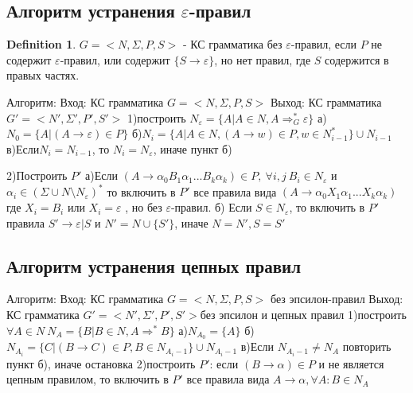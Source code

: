 \documentclass[a4paper]{article}
\theoremstyle{plain}
\theoremstyle{remark}
\theoremstyle{definition}
\newtheorem*{definition-star}{Definition}
\begin{document}
\subsection{Алгоритм устранения $\varepsilon$-правил}
\begin{definition-star}$G=<N,\Sigma,P,S>$ - КС грамматика без $\varepsilon$-правил, если $P$ не содержит $\varepsilon$-правил, или содержит $\{S\rightarrow \varepsilon\}$, но нет правил, где $S$ содержится в правых частях.
\end{definition-star}
Алгоритм:
Вход: КС грамматика $G=<N,\Sigma,P,S>$
Выход: КС грамматика $G'=<N',\Sigma',P',S'>$
1)построить $N_\varepsilon = \{A|A\in N,A \Rightarrow_G^* \varepsilon\}$
а)$N_0=\{A|(A\rightarrow \varepsilon) \in P\}$
б)$N_i = \{A|A\in N,(A \rightarrow w)\in P, w \in N_{i-1}^*\} \cup N_{i-1}$
в)Если$N_i = N_{i-1}$, то $N_i=N_\varepsilon$, иначе пункт б)

2)Построить $P'$
а)Если $(A\rightarrow \alpha_0B_1\alpha_1...B_k\alpha_k)\in P,\  \forall i,j \ B_i \in N_\varepsilon$ и $\alpha_i \in (\Sigma \cup N\setminus N_\varepsilon)^*$
то включить в $P'$ все правила вида $(A\rightarrow \alpha_0X_1\alpha_1...X_k\alpha_k)$где $X_i=B_i$ или $X_i=\varepsilon$ , но без $\varepsilon$-правил.
б) Если $S\in N_\varepsilon$, то включить в $P'$ правила  $S'\rightarrow\varepsilon|S$ и $N'=N\cup\{S'\}$, иначе $N=N',S=S'$
\subsection{Алгоритм устранения цепных правил}
Алгоритм:
Вход: КС грамматика $G=<N,\Sigma,P,S>$ без эпсилон-правил
Выход: КС грамматика $G'=<N',\Sigma',P',S'>$без эпсилон и цепных правил
1)построить $ \forall A \in N \  N_A = \{B|B\in N,A \Rightarrow^*B\}$
а)$N_{A_0}=\{A\}$
б)$N_{A_i}=\{C|(B\rightarrow C)\in P , B\in N_{A_i-1}\}\cup N_{A_i-1}$
в)Если $N_{A_i-1}\ne N_A$  повторить пункт б), иначе остановка
2)построить $P'$:
если $(B\rightarrow \alpha)\in P$ и не является цепным правилом, то  включить в $P'$ все правила вида $A\rightarrow \alpha, \forall A: B\in N_A$
\end{document}
